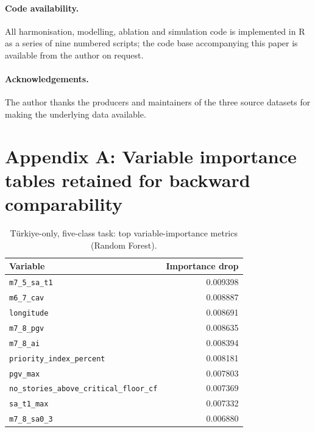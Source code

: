 \documentclass[11pt,a4paper]{article}
\begin{document}
\paragraph{Code availability.} All harmonisation, modelling,
ablation and simulation code is implemented in R as a series of
nine numbered scripts; the code base
accompanying this paper is available from the author on request.

\paragraph{Acknowledgements.} The author thanks the producers and
maintainers of the three source datasets for making the
underlying data available.



\newpage
\appendix
\section*{Appendix A: Variable importance tables retained for
backward comparability}

\begin{table}[!h]
\centering
\caption{T\"urkiye-only, five-class task: top variable-importance
metrics (Random Forest).}
\label{tab:imp-turkiye-5}
\small
\begin{tabular}{l r}
\toprule
Variable & Importance drop \\
\midrule
\texttt{m7\_5\_sa\_t1}                      & 0.009398 \\
\texttt{m6\_7\_cav}                          & 0.008887 \\
\texttt{longitude}                           & 0.008691 \\
\texttt{m7\_8\_pgv}                          & 0.008635 \\
\texttt{m7\_8\_ai}                           & 0.008394 \\
\texttt{priority\_index\_percent}            & 0.008181 \\
\texttt{pgv\_max}                            & 0.007803 \\
\texttt{no\_stories\_above\_critical\_floor\_cf} & 0.007369 \\
\texttt{sa\_t1\_max}                         & 0.007332 \\
\texttt{m7\_8\_sa0\_3}                       & 0.006880 \\
\bottomrule
\end{tabular}
\end{table}
\end{document}
